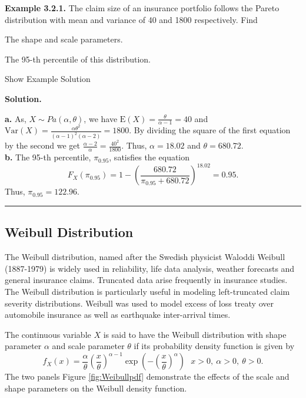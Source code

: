 \documentclass[]{book}
\theoremstyle{definition}
\theoremstyle{definition}
\theoremstyle{definition}
\theoremstyle{remark}
\begin{document}
\textbf{Example 3.2.1. } The claim size of an insurance portfolio
follows the Pareto distribution with mean and variance of 40 and 1800
respectively. Find

The shape and scale parameters.

The 95-th percentile of this distribution.

Show Example Solution

\hypertarget{toggleExampleLoss.2.1}{}
\textbf{Solution.}

\textbf{a.} As, \(X\sim Pa(\alpha,\theta)\), we have
\(\mathrm{E}\left( X \right) = \frac{\theta}{\alpha - 1} = 40\) and
\(\mathrm{Var}\left( X \right) = \frac{\alpha\theta^{2}}{\left( \alpha - 1 \right)^{2}\left( \alpha - 2 \right)} = 1800\).
By dividing the square of the first equation by the second we get
\(\frac{\alpha - 2}{\alpha} = \frac{40^{2}}{1800}\). Thus,
\(\alpha = 18.02\) and \(\theta = 680.72\).\\
\textbf{b.} The 95-th percentile, \(\pi_{0.95}\), satisfies the equation
\[F_{X}\left( \pi_{0.95} \right) = 1 - \left( \frac{680.72}{\pi_{0.95} + 680.72} \right)^{18.02} = 0.95.\]
Thus, \(\pi_{0.95} = 122.96\).

\begin{center}\rule{0.5\linewidth}{\linethickness}\end{center}

\subsection{Weibull Distribution}\label{weibull-distribution}

The Weibull distribution, named after the Swedish physicist Waloddi
Weibull (1887-1979) is widely used in reliability, life data analysis,
weather forecasts and general insurance claims. Truncated data arise
frequently in insurance studies. The Weibull distribution is
particularly useful in modeling left-truncated claim severity
distributions. Weibull was used to model excess of loss treaty over
automobile insurance as well as earthquake inter-arrival times.

The continuous variable \(X\) is said to have the Weibull distribution
with shape parameter \(\alpha\) and scale parameter \(\theta\) if its
probability density function is given by
\[f_{X}\left( x \right) = \frac{\alpha}{\theta}\left( \frac{x}{\theta} \right)^{\alpha - 1} \exp \left(- \left( \frac{x}{\theta} \right)^{\alpha}\right) \ \ \ x > 0,\ \alpha > 0,\ \theta > 0.\]
The two panels Figure \ref{fig:Weibullpdf} demonstrate the effects of
the scale and shape parameters on the Weibull density function.
\end{document}
